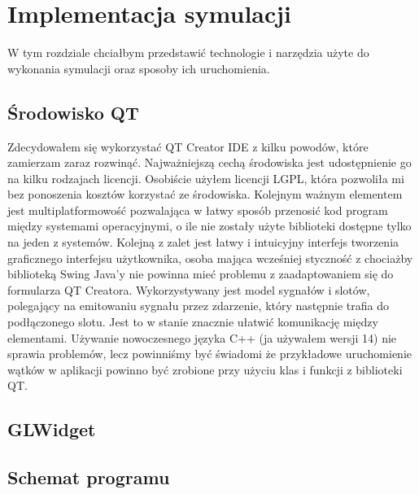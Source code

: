 \chapter{Implementacja symulacji}
\label{cha:implementacja}

W tym rozdziale chciałbym przedstawić technologie i narzędzia użyte do wykonania symulacji oraz sposoby ich uruchomienia.


\section{Środowisko QT}
\label{sec:qt}
Zdecydowałem się wykorzystać QT Creator IDE z kilku powodów, które zamierzam zaraz rozwinąć. Najważniejszą cechą środowiska jest udostępnienie go na kilku rodzajach licencji. Osobiście użyłem licencji LGPL, która pozwoliła mi bez ponoszenia kosztów korzystać ze środowiska. Kolejnym ważnym elementem jest multiplatformowość pozwalająca w łatwy sposób przenosić kod program między systemami operacyjnymi, o ile nie zostały użyte biblioteki dostępne tylko na jeden z systemów. Kolejną z zalet jest łatwy i intuicyjny interfejs tworzenia graficznego interfejsu użytkownika, osoba mająca wcześniej styczność z chociażby biblioteką Swing Java'y nie powinna mieć problemu z zaadaptowaniem się do  formularza QT Creatora. Wykorzystywany jest model sygnałów i slotów, polegający na emitowaniu sygnału przez zdarzenie, który następnie trafia do podłączonego slotu. Jest to w stanie znacznie ułatwić komunikację między elementami. Używanie nowoczesnego języka C++ (ja używałem wersji 14) nie sprawia problemów, lecz powinniśmy być świadomi że przykładowe uruchomienie wątków w aplikacji powinno być zrobione przy użyciu klas i funkcji z biblioteki QT.


\section{GLWidget}
\label{sec:glwidget}


\section{Schemat programu}
\label{sec::schemat}


